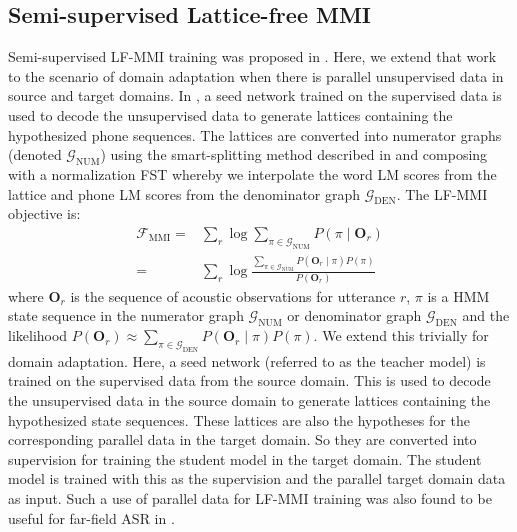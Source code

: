 \documentclass{article}
\newcommand{\oOr}[1]{\mathbf{O}_{#1}}
\newcommand{\pr}{{P}}
\newcommand{\DenG}{\mathcal{G}_\text{DEN}}
\newcommand{\NumG}{\mathcal{G}_\text{NUM}}
\newcommand{\Fmmi}{\mathcal{F}_\text{MMI}}
\begin{document}

\subsection{Semi-supervised Lattice-free MMI}
\label{sec:lfmmi}

Semi-supervised LF-MMI training was proposed in \cite{manohar2018semisup}.
Here, we extend that work to the scenario of domain adaptation when there is 
parallel unsupervised data in source and target domains.
In \cite{manohar2018semisup}, a seed network trained on the supervised data 
is used to decode the unsupervised data to generate lattices containing the
hypothesized phone sequences.
The lattices are converted into numerator graphs (denoted $\NumG$) using the 
smart-splitting method described in \cite{manohar2018semisup} and 
composing with a
normalization FST \cite{chain} whereby we interpolate the word 
LM scores from the lattice and phone LM scores from the denominator graph 
$\DenG$. The LF-MMI objective is:
\begin{align}
	\Fmmi =& \sum_r \log \sum_{\pi\in\NumG} 
  \pr(\pi\mid \oOr{r}) \\
  =& \sum_r \log \frac{\sum_{\pi\in\NumG} \pr(\oOr{r}\mid\pi) \pr(\pi)} {\pr(\oOr{r})}
  \label{eq:lfmmi}
\end{align}
where $\oOr{r}$ is the sequence of acoustic observations for utterance $r$, 
$\pi$ is a HMM state sequence in the numerator graph $\NumG$ or
denominator graph $\DenG$ and the likelihood
$\pr(\oOr{r}) \approx \sum_{\pi\in\DenG} \pr(\oOr{r}\mid\pi) \pr(\pi)$.
We extend this trivially for domain adaptation. Here, a seed network 
(referred to as the teacher model) is trained on the supervised data from the
source domain. This is used to decode the unsupervised data in the source domain
to generate lattices containing the hypothesized state sequences.  These
lattices are also the hypotheses for the corresponding parallel data in the
target domain. 
So they are converted into supervision for training the student model in the 
target domain. The student model is trained with this as the supervision and 
the parallel target domain data as input. Such a use of parallel data for LF-MMI
training was also found to be useful for far-field ASR in \cite{vijay_ami}.
\end{document}

